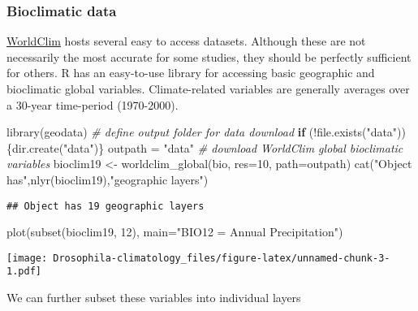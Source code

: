 \documentclass[
]{article}
\newenvironment{Shaded}{\begin{snugshade}}{\end{snugshade}}
\newcommand{\AttributeTok}[1]{\textcolor[rgb]{0.77,0.63,0.00}{#1}}
\newcommand{\CommentTok}[1]{\textcolor[rgb]{0.56,0.35,0.01}{\textit{#1}}}
\newcommand{\ControlFlowTok}[1]{\textcolor[rgb]{0.13,0.29,0.53}{\textbf{#1}}}
\newcommand{\DecValTok}[1]{\textcolor[rgb]{0.00,0.00,0.81}{#1}}
\newcommand{\FunctionTok}[1]{\textcolor[rgb]{0.00,0.00,0.00}{#1}}
\newcommand{\NormalTok}[1]{#1}
\newcommand{\OtherTok}[1]{\textcolor[rgb]{0.56,0.35,0.01}{#1}}
\newcommand{\SpecialCharTok}[1]{\textcolor[rgb]{0.00,0.00,0.00}{#1}}
\newcommand{\StringTok}[1]{\textcolor[rgb]{0.31,0.60,0.02}{#1}}
\begin{document}
\hypertarget{bioclimatic-data}{%
\subsubsection{Bioclimatic data}\label{bioclimatic-data}}

\href{https://www.worldclim.org/}{WorldClim} hosts several easy to
access datasets. Although these are not necessarily the most accurate
for some studies, they should be perfectly sufficient for others. R has
an easy-to-use library for accessing basic geographic and bioclimatic
global variables. Climate-related variables are generally averages over
a 30-year time-period (1970-2000).

\begin{Shaded}
\begin{Highlighting}[]
\FunctionTok{library}\NormalTok{(geodata)}
\CommentTok{\# define output folder for data download}
\ControlFlowTok{if}\NormalTok{ (}\SpecialCharTok{!}\FunctionTok{file.exists}\NormalTok{(}\StringTok{"data"}\NormalTok{))\{}\FunctionTok{dir.create}\NormalTok{(}\StringTok{"data"}\NormalTok{)\}}
\NormalTok{outpath }\OtherTok{=} \StringTok{"data"}
\CommentTok{\# download WorldClim global bioclimatic variables}
\NormalTok{bioclim19 }\OtherTok{\textless{}{-}} \FunctionTok{worldclim\_global}\NormalTok{(}\StringTok{\textquotesingle{}bio\textquotesingle{}}\NormalTok{, }\AttributeTok{res=}\DecValTok{10}\NormalTok{, }\AttributeTok{path=}\NormalTok{outpath)}
\FunctionTok{cat}\NormalTok{(}\StringTok{"Object has"}\NormalTok{,}\FunctionTok{nlyr}\NormalTok{(bioclim19),}\StringTok{"geographic layers"}\NormalTok{) }
\end{Highlighting}
\end{Shaded}

\begin{verbatim}
## Object has 19 geographic layers
\end{verbatim}

\begin{Shaded}
\begin{Highlighting}[]
\FunctionTok{plot}\NormalTok{(}\FunctionTok{subset}\NormalTok{(bioclim19, }\DecValTok{12}\NormalTok{), }\AttributeTok{main=}\StringTok{"BIO12 = Annual Precipitation"}\NormalTok{)}
\end{Highlighting}
\end{Shaded}

\texttt{[image: Drosophila-climatology\_files/figure-latex/unnamed-chunk-3-1.pdf]}

We can further subset these variables into individual layers
\end{document}
